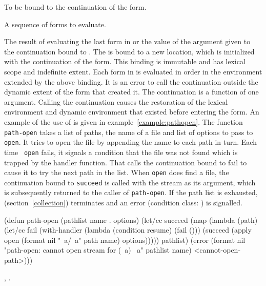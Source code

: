 \begin{optDefinition}

%
\Syntax
{}%
%
\begin{arguments}
    \item[\scref{identifier}] To be bound to the continuation of the
     form.
    \item[\scseqref{form}] A sequence of forms to evaluate.
\end{arguments}
%
\result%
The result of evaluating the last form in  or the value of
the argument given to the continuation bound to .
%
\remarks%
The  is bound to a new location, which is initialized with the
continuation of the  form.  This binding is immutable and has
lexical scope and indefinite extent.  Each form in  is evaluated in order
in the environment extended by the above binding.  It is an error to call the
continuation outside the dynamic extent of the  form that
created it.  The continuation is a function of one argument.  Calling the
continuation causes the restoration of the lexical environment and dynamic
environment that existed before entering the  form.
%
\examples%
An example of the use of  is given in
example~\ref{example:pathopen}.  The function {\tt path-open} takes a list of
paths, the name of a file and list of options to pass to {\tt open}.  It tries
to open the file by appending the name to each path in turn.  Each time {\tt
    open} fails, it signals a condition that the file was not found which is
trapped by the handler function.  That calls the continuation bound to fail to
cause it to try the next path in the list.  When {\tt open} does find a file,
the continuation bound to {\tt succeed} is called with the stream as its
argument, which is subsequently returned to the caller of {\tt path-open}.  If
the path list is exhausted,  (section~\ref{collection})
terminates and an error (condition class: ) is
signalled.
%
\begin{example}
\label{example:pathopen}
{\syntax
(defun path-open (pathlist name . options)
  (let/cc succeed
    (map
      (lambda (path)
        (let/cc fail
          (with-handler
            (lambda (condition resume) (fail ()))
            (succeed (apply open
                       (format nil "~a/~a" path name)
                       options)))))
      pathlist)
    (error
      (format nil
        "path-open: cannot open stream for (~a) ~a"
        pathlist name)
      <cannot-open-path>)))
\endsyntax}
\end{example}
%
\seealso%
, .


\end{optDefinition}
